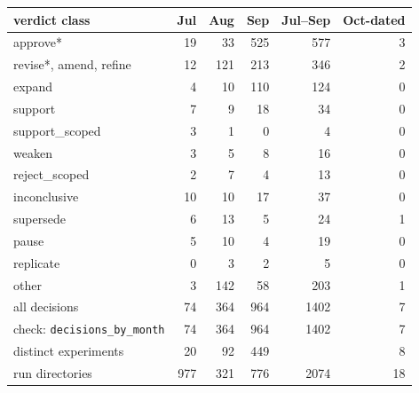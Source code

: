 \begin{tabular}{@{}lrrrrr@{}}
\toprule
verdict class & Jul & Aug & Sep & Jul--Sep & Oct-dated \\
\midrule
approve* & 19 & 33 & 525 & 577 & 3 \\
revise*, amend, refine & 12 & 121 & 213 & 346 & 2 \\
expand & 4 & 10 & 110 & 124 & 0 \\
\addlinespace
support & 7 & 9 & 18 & 34 & 0 \\
support\_scoped & 3 & 1 & 0 & 4 & 0 \\
weaken & 3 & 5 & 8 & 16 & 0 \\
reject\_scoped & 2 & 7 & 4 & 13 & 0 \\
inconclusive & 10 & 10 & 17 & 37 & 0 \\
supersede & 6 & 13 & 5 & 24 & 1 \\
pause & 5 & 10 & 4 & 19 & 0 \\
replicate & 0 & 3 & 2 & 5 & 0 \\
\addlinespace
other & 3 & 142 & 58 & 203 & 1 \\
\midrule
all decisions & 74 & 364 & 964 & 1402 & 7 \\
\quad check: \texttt{decisions\_by\_month} & 74 & 364 & 964 & 1402 & 7 \\
distinct experiments & 20 & 92 & 449 & & 8 \\
run directories & 977 & 321 & 776 & 2074 & 18 \\
\bottomrule
\end{tabular}
